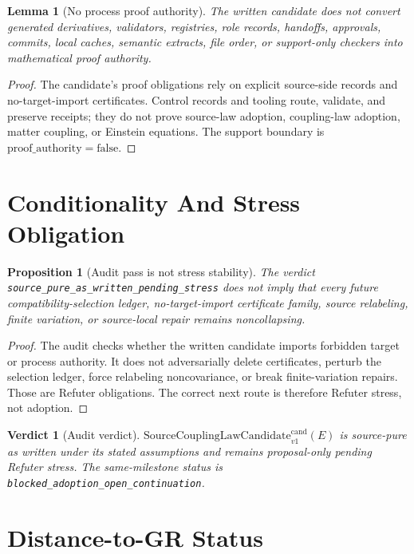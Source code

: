 \documentclass[11pt]{article}
\newcommand{\SourceCoupCand}{\mathrm{SourceCouplingLawCandidate}^{\mathrm{cand}}_{v1}}
\newcommand{\ProofAuthFalse}{\mathrm{proof\_authority=false}}
\newtheorem{lemma}{Lemma}
\newtheorem{proposition}{Proposition}
\newtheorem{verdict}{Verdict}
\begin{document}
\begin{lemma}[No process proof authority]
The written candidate does not convert generated derivatives, validators,
registries, role records, handoffs, approvals, commits, local caches,
semantic extracts, file order, or support-only checkers into mathematical
proof authority.
\end{lemma}

\begin{proof}
The candidate's proof obligations rely on explicit source-side records and
no-target-import certificates. Control records and tooling route, validate,
and preserve receipts; they do not prove source-law adoption, coupling-law
adoption, matter coupling, or Einstein equations. The support boundary is
\(\ProofAuthFalse\).
\end{proof}

\section{Conditionality And Stress Obligation}

\begin{proposition}[Audit pass is not stress stability]
The verdict \texttt{source\_pure\_as\_written\_pending\_stress} does not
imply that every future compatibility-selection ledger, no-target-import
certificate family, source relabeling, finite variation, or source-local
repair remains noncollapsing.
\end{proposition}

\begin{proof}
The audit checks whether the written candidate imports forbidden target or
process authority. It does not adversarially delete certificates, perturb the
selection ledger, force relabeling noncovariance, or break finite-variation
repairs. Those are Refuter obligations. The correct next route is therefore
Refuter stress, not adoption.
\end{proof}

\begin{verdict}[Audit verdict]
\(\SourceCoupCand(E)\) is source-pure as written under its stated assumptions
and remains proposal-only pending Refuter stress. The same-milestone status is
\texttt{blocked\_adoption\_open\_continuation}.
\end{verdict}

\section{Distance-to-GR Status}
\end{document}
